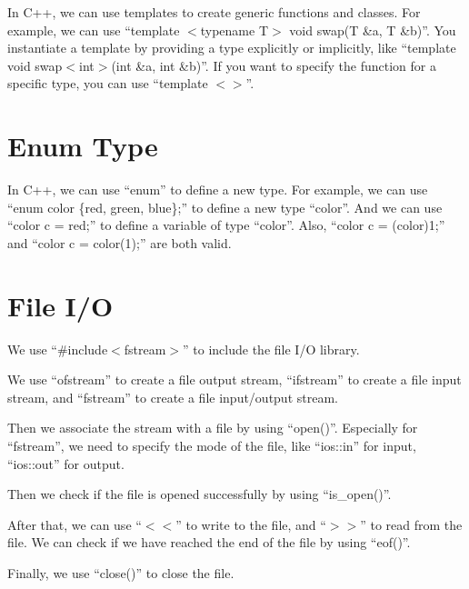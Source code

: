 \documentclass[a4paper,12pt]{article}
\begin{document}
In C++, we can use templates to create generic functions and classes.
For example, we can use ``template $<$typename T$>$ void swap(T \&a, T \&b)''.
You instantiate a template by providing a type explicitly or implicitly, like ``template void swap$<$int$>$(int \&a, int \&b)''.
If you want to specify the function for a specific type, you can use ``template $<>$''.

\section*{Enum Type}

In C++, we can use ``enum'' to define a new type.
For example, we can use ``enum color \{red, green, blue\};'' to define a new type ``color''.
And we can use ``color c = red;'' to define a variable of type ``color''.
Also, ``color c = (color)1;'' and ``color c = color(1);'' are both valid.

\section*{File I/O}

We use ``\#include$<$fstream$>$'' to include the file I/O library.

We use ``ofstream'' to create a file output stream, ``ifstream'' to create a file input stream, and ``fstream'' to create a file input/output stream.

Then we associate the stream with a file by using ``open()''.
Especially for ``fstream'', we need to specify the mode of the file, like ``ios::in'' for input, ``ios::out'' for output.

Then we check if the file is opened successfully by using ``is\_open()''.

After that, we can use ``$<<$'' to write to the file, and ``$>>$'' to read from the file.
We can check if we have reached the end of the file by using ``eof()''.

Finally, we use ``close()'' to close the file.
\end{document}
